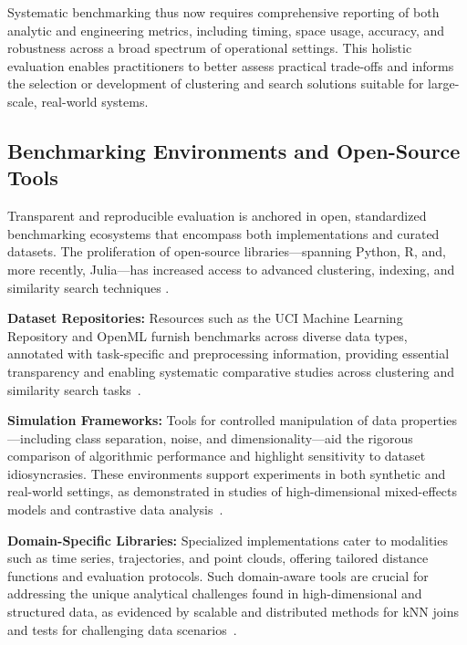 \documentclass[sigconf]{acmart}
\begin{document}
Systematic benchmarking thus now requires comprehensive reporting of both analytic and engineering metrics, including timing, space usage, accuracy, and robustness across a broad spectrum of operational settings. This holistic evaluation enables practitioners to better assess practical trade-offs and informs the selection or development of clustering and search solutions suitable for large-scale, real-world systems.

\subsection{Benchmarking Environments and Open-Source Tools}

Transparent and reproducible evaluation is anchored in open, standardized benchmarking ecosystems that encompass both implementations and curated datasets. The proliferation of open-source libraries—spanning Python, R, and, more recently, Julia—has increased access to advanced clustering, indexing, and similarity search techniques \cite{ref14, ref21, ref22, ref27, ref28, ref30, ref33, ref36, ref37, ref38, ref39, ref40, ref44, ref46, ref64, ref68, ref75, ref80, ref81, ref86, ref87, ref91, ref92, ref93, ref94, ref95, ref99, ref100, ref110}.

\textbf{Dataset Repositories:} Resources such as the UCI Machine Learning Repository and OpenML furnish benchmarks across diverse data types, annotated with task-specific and preprocessing information, providing essential transparency and enabling systematic comparative studies across clustering and similarity search tasks~\cite{ref14, ref80, ref81, ref87, ref92, ref93}.

\textbf{Simulation Frameworks:} Tools for controlled manipulation of data properties—including class separation, noise, and dimensionality—aid the rigorous comparison of algorithmic performance and highlight sensitivity to dataset idiosyncrasies. These environments support experiments in both synthetic and real-world settings, as demonstrated in studies of high-dimensional mixed-effects models and contrastive data analysis~\cite{ref33, ref99, ref100, ref110}.

\textbf{Domain-Specific Libraries:} Specialized implementations cater to modalities such as time series, trajectories, and point clouds, offering tailored distance functions and evaluation protocols. Such domain-aware tools are crucial for addressing the unique analytical challenges found in high-dimensional and structured data, as evidenced by scalable and distributed methods for kNN joins and tests for challenging data scenarios~\cite{ref75, ref92, ref93, ref94}.
\end{document}

